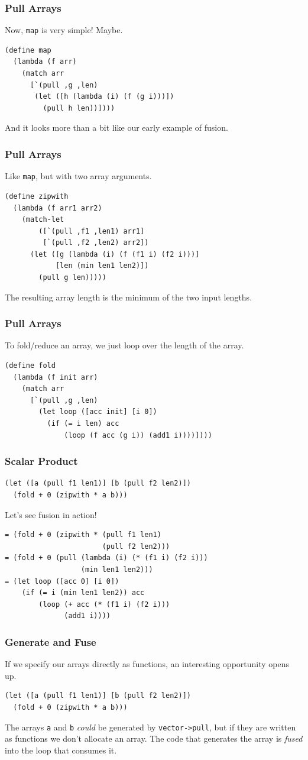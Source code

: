 \documentclass[12pt,letterpaper]{beamer}
\begin{document}
\begin{frame}[fragile]
\frametitle{Pull Arrays}
Now, {\tt map} is very simple! Maybe.
\begin{lstlisting}
(define map
  (lambda (f arr) 
    (match arr
      [`(pull ,g ,len)
       (let ([h (lambda (i) (f (g i)))])
         (pull h len))])))
\end{lstlisting}
And it looks more than a bit like our early example of fusion.
\end{frame}

\begin{frame}[fragile]
\frametitle{Pull Arrays}
Like {\tt map}, but with two array arguments.
\begin{lstlisting}
(define zipwith
  (lambda (f arr1 arr2)
    (match-let
        ([`(pull ,f1 ,len1) arr1]
         [`(pull ,f2 ,len2) arr2])
      (let ([g (lambda (i) (f (f1 i) (f2 i)))]
            [len (min len1 len2)])
        (pull g len)))))
\end{lstlisting}
The resulting array length is the minimum of the two
input lengths.
\end{frame}

\begin{frame}[fragile]
\frametitle{Pull Arrays}
To fold/reduce an array, we just loop over the length of the array.
\begin{lstlisting}
(define fold
  (lambda (f init arr)
    (match arr
      [`(pull ,g ,len)
        (let loop ([acc init] [i 0])
          (if (= i len) acc
              (loop (f acc (g i)) (add1 i))))])))
\end{lstlisting}
\end{frame}

\begin{frame}[fragile]
\frametitle{Scalar Product}
\begin{lstlisting}
(let ([a (pull f1 len1)] [b (pull f2 len2)])
  (fold + 0 (zipwith * a b)))
\end{lstlisting}
Let's see fusion in action!
\begin{lstlisting}
= (fold + 0 (zipwith * (pull f1 len1) 
                       (pull f2 len2)))
= (fold + 0 (pull (lambda (i) (* (f1 i) (f2 i)))
                  (min len1 len2)))
= (let loop ([acc 0] [i 0])
    (if (= i (min len1 len2)) acc
        (loop (+ acc (* (f1 i) (f2 i))) 
              (add1 i))))
\end{lstlisting}
\end{frame}


\begin{frame}[fragile]
\frametitle{Generate and Fuse}
If we specify our arrays directly as functions, an interesting opportunity opens up. 
\begin{lstlisting}
(let ([a (pull f1 len1)] [b (pull f2 len2)])
  (fold + 0 (zipwith * a b)))
\end{lstlisting}
The arrays {\tt a} and {\tt b} {\em could} be generated by
{\tt vector->pull}, but if they are written 
as functions we don't allocate an array. 
The code that generates the array is {\em fused} into the 
loop that consumes it.
\end{frame}
\end{document}
